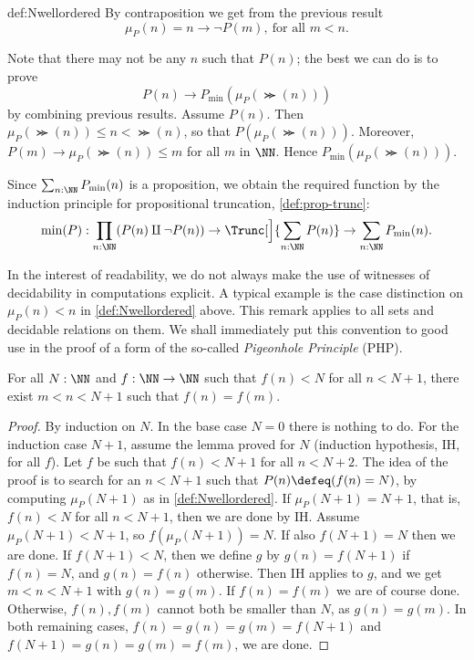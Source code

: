 \begin{implementation}{def:Nwellordered}
By contraposition we get from the previous result
\[
\mu_P(n) = n \to \neg P(m),~\text{for all $m<n$.}
\]

Note that there may not be any $n$ such that $P(n)$;
the best we can do is to prove
\[
P(n)\to P_{\min}(\mu_P(\Succ(n)))
\]
by combining previous results. Assume $P(n)$.
Then $\mu_P(\Succ(n))\leq n < \Succ(n)$, so that $P(\mu_P(\Succ(n)))$.
Moreover, $P(m) \to \mu_P(\Succ(n))\leq m$ for all $m$ in $\NN$.
Hence $P_{\min}(\mu_P(\Succ(n)))$.

Since $\sum_{n:\NN} P_{\min}(n)$ is a proposition,
we obtain the required function by the induction
principle for propositional truncation, \cref{def:prop-trunc}:
\[
\min(P) : \prod_{n:\NN}(P(n)\amalg\neg P(n)) \to
           \Trunc[\Big]{\sum_{n:\NN} P(n)} \to  \sum_{n:\NN} P_{\min}(n).\qedhere
\]
\end{implementation}

\begin{remark}\label{rem:computations-can-decide}
In the interest of readability, we do not always make the use
of witnesses of decidability in computations explicit.
A typical example is the case distinction on $\mu_P(n) < n$ in
\cref{def:Nwellordered} above. This remark applies to all
sets and decidable relations on them. We shall immediately put
this convention to good use in the proof of a form of the so-called
\emph{Pigeonhole Principle} (PHP).
\end{remark}

\begin{lemma}\label{lem:PHP}
For all $N:\NN$ and $f:\NN\to\NN$ such that $f(n)<N$
for all $n<N+1$, there exist $m < n < N+1$ such that $f(n) = f(m)$.
\end{lemma}
\begin{proof}
By induction on $N$. In the base case $N = 0$ there is nothing to do.
For the induction case $N+1$, assume the lemma proved for $N$
(induction hypothesis, IH, for all $f$). Let $f$ be such
that $f(n)<N+1$ for all $n<N+2$. The idea of the proof is
to search for an $n<N+1$ such that $P(n)\defeq (f(n) = N)$,
by computing $\mu_P(N+1)$ as in \cref{def:Nwellordered}.
If $\mu_P(N+1) = N+1$, that is, $f(n)<N$ for all $n<N+1$,
then we are done by IH. Assume $\mu_P(N+1) < N+1$,
so $f(\mu_P(N+1)) = N$.
If also $f(N+1) = N$ then we are done.
If $f(N+1)<N$, then we define $g$ by $g(n) = f(N+1)$
if $f(n) = N$, and $g(n) = f(n)$ otherwise.
Then IH applies to $g$, and we get $m < n < N+1$ with
$g(n) = g(m)$. If $f(n) = f(m)$ we are of course done.
Otherwise, $f(n),f(m)$ cannot both be smaller than $N$,
as $g(n) = g(m)$. In both remaining cases,
$f(n) = g(n) = g(m) = f(N+1)$ and $f(N+1) = g(n) = g(m) = f(m)$,
we are done.
\end{proof}

